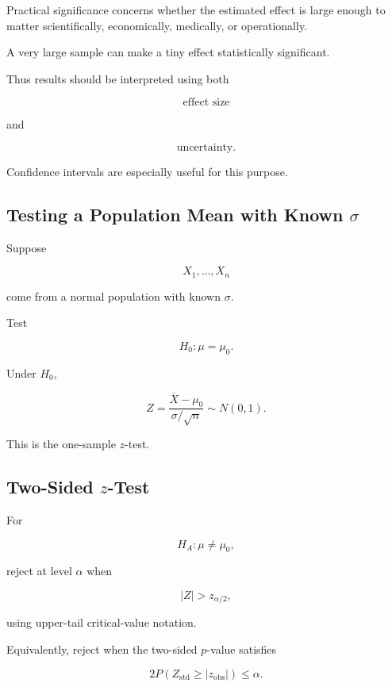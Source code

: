 Practical significance concerns whether the estimated effect is large
enough to matter scientifically, economically, medically, or
operationally.

A very large sample can make a tiny effect statistically significant.

Thus results should be interpreted using both

\[
\boxed{
\text{effect size}
}
\]

and

\[
\boxed{
\text{uncertainty}.
}
\]

Confidence intervals are especially useful for this purpose.

\subsection{Testing a Population Mean with Known \(\sigma\)}
\label{subsec:z-test-one-mean}

Suppose

\[
X_1,\ldots,X_n
\]

come from a normal population with known \(\sigma\).

Test

\[
H_0:\mu=\mu_0.
\]

Under \(H_0\),

\[
\boxed{
Z
=
\frac{
\overline{X}-\mu_0
}{
\sigma/\sqrt{n}
}
\sim
N(0,1).
}
\]

This is the one-sample \(z\)-test.

\subsection{Two-Sided \(z\)-Test}
\label{subsec:two-sided-z-test}

For

\[
H_A:\mu\neq\mu_0,
\]

reject at level \(\alpha\) when

\[
\boxed{
|Z|
>
z_{\alpha/2},
}
\]

using upper-tail critical-value notation.

Equivalently, reject when the two-sided \(p\)-value satisfies

\[
\boxed{
2P(Z_{\text{std}}\geq|z_{\text{obs}}|)
\leq
\alpha.
}
\]

